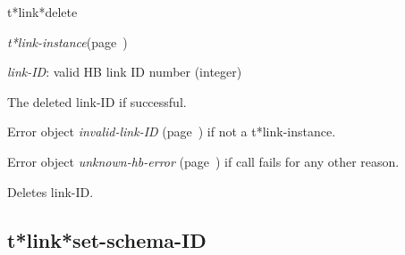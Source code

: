 \begin{description}
\item [Name:]  t*link*delete

\item [Class:] {\sl t*link-instance}\hfill(page~\pageref{t*link-instance})

\item [Parameters:]
\item {\sl link-ID}:  
valid HB link ID number (integer)


\item [Return-value:]
The deleted link-ID if successful.

Error object {\sl invalid-link-ID} (page~\pageref{invalid-link-ID}) if not a t*link-instance.

Error object {\sl unknown-hb-error} (page~\pageref{unknown-hb-error}) if call fails
for any other reason.

\item [Description:]

Deletes link-ID.

\item [Public:]



\end{description}
\horizontalline

\subsection{t*link*set-schema-ID}
\label{t*link*set-schema-ID}

